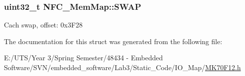 \subsubsection[{S\+W\+A\+P}]{\setlength{\rightskip}{0pt plus 5cm}uint32\+\_\+t N\+F\+C\+\_\+\+Mem\+Map\+::\+S\+W\+A\+P}\label{struct_n_f_c___mem_map_acb4d1261ff3c34b54bc5c14496f742ac}
Cach swap, offset\+: 0x3\+F28 

The documentation for this struct was generated from the following file\+:\begin{DoxyCompactItemize}
\item 
E\+:/\+U\+T\+S/\+Year 3/\+Spring Semester/48434 -\/ Embedded Software/\+S\+V\+N/embedded\+\_\+software/\+Lab3/\+Static\+\_\+\+Code/\+I\+O\+\_\+\+Map/\hyperlink{_m_k70_f12_8h}{M\+K70\+F12.\+h}\end{DoxyCompactItemize}

